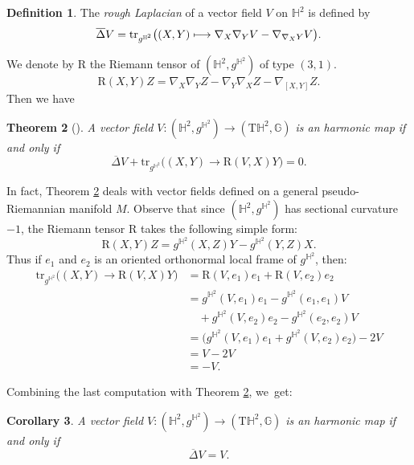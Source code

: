 \documentclass[10pt]{amsart}
\newcommand\mto{\mathchoice{\longmapsto}{\mapsto}{\mapsto}{\mapsto}}
\let\ra\rightarrow
\theoremstyle{plain}
\newtheorem{cor}{Corollary}[section]
\newtheorem{theorem}[cor]{Theorem}
\theoremstyle{definition}
\newtheorem{defi}[cor]{Definition}
\begin{document}
\begin{defi}
The \emph{rough Laplacian} of a vector field $V$ on $\mathbb{H}^2$ is defined by
\[
\overline{\Delta}V=\mathrm{tr}_{g^{\mathbb{H}^2}}\big((X,Y)\mto \nabla_X\nabla_Y V-\nabla_{\nabla_X Y}V \big).
\]
\end{defi}
We denote by $\mathrm{R}$ the Riemann tensor of $(\mathbb{H}^2,g^{\mathbb{H}^2})$ of type $(3,1)$.
\[
\mathrm{R}(X,Y)Z=\nabla_X\nabla_YZ-\nabla_Y\nabla_XZ-\nabla_{[X,Y]}Z.
\]
Then we have
\begin{theorem}[{\cite[Prop.\,4.1]{on_harmonic_vector_field}}]\label{on_harmonic_vector_field}
A vector field $V:(\mathbb{H}^2,g^{\mathbb{H}^2})\to(\mathrm{T}\mathbb{H}^2,\mathbb{G})$ is an harmonic map if and only if
\[
\overline{\Delta}V+\mathrm{tr}_{g^{\mathbb{H}^2}}\big((X,Y)\ra\mathrm{R}(V,X)Y \big)=0.
\]
\end{theorem}
In fact, Theorem \ref{on_harmonic_vector_field} deals with vector fields defined on a general pseudo-Riemannian manifold $M$. Observe that since $(\mathbb{H}^2,g^{\mathbb{H}^2})$ has sectional curvature $-1$, the Riemann tensor $\mathrm{R}$ takes the following simple form:
\[
\mathrm{R}(X,Y)Z=g^{\mathbb{H}^2}(X,Z)Y-g^{\mathbb{H}^2}(Y,Z)X.
\]
Thus if $e_1$ and $e_2$ is an oriented orthonormal local frame of $g^{\mathbb{H}^2}$, then:
\begin{align*}
\mathrm{tr}_{g^{\mathbb{H}^2}}\big((X,Y)\to\mathrm{R}(V,X)Y \big)
&=\mathrm{R}(V,e_1)e_1+\mathrm{R}(V,e_2)e_2 \\
&= g^{\mathbb{H}^2}(V,e_1)e_1 - g^{\mathbb{H}^2}(e_1,e_1)V \\
&\quad + g^{\mathbb{H}^2}(V,e_2)e_2 - g^{\mathbb{H}^2}(e_2,e_2)V \\
&= \big(g^{\mathbb{H}^2}(V,e_1)e_1+g^{\mathbb{H}^2}(V,e_2)e_2\big)-2V \\
&= V-2V \\
&= -V.
\end{align*}

Combining the last computation with Theorem \ref{on_harmonic_vector_field}, we~get:

\begin{cor}\label{cor_on_harmonic_vector_field}
A vector field $V:(\mathbb{H}^2,g^{\mathbb{H}^2})\to(\mathrm{T}\mathbb{H}^2,\mathbb{G})$ is an harmonic map if and only if
\[
\overline{\Delta}V=V.
\]
\end{cor}
\end{document}
